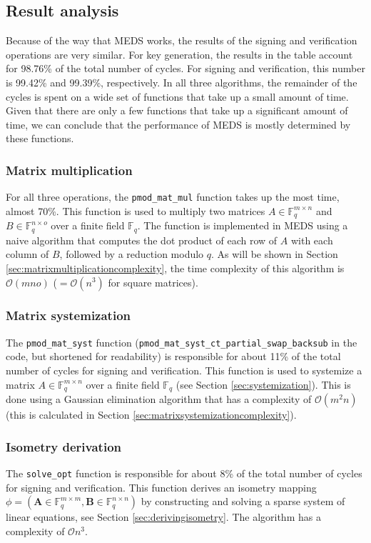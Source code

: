 \documentclass[11pt,a4paper]{report}
\theoremstyle{definition}
\begin{document}
\subsection{Result analysis}
Because of the way that MEDS works, the results of the signing and verification operations are very similar. For key generation, the results in the table account for 98.76\% of the total number of cycles. For signing and verification, this number is 99.42\% and 99.39\%, respectively. In all three algorithms, the remainder of the cycles is spent on a wide set of functions that take up a small amount of time. Given that there are only a few functions that take up a significant amount of time, we can conclude that the performance of MEDS is mostly determined by these functions.

\subsubsection{Matrix multiplication}
For all three operations, the \texttt{pmod\_mat\_mul} function takes up the most time, almost 70\%. This function is used to multiply two matrices $A \in \mathbb{F}_q^{m \times n}$ and $B \in \mathbb{F}_q^{n \times o}$ over a finite field $\mathbb{F}_q$. The function is implemented in MEDS using a naive algorithm that computes the dot product of each row of $A$ with each column of $B$, followed by a reduction modulo $q$. As will be shown in Section \ref{sec:matrixmultiplicationcomplexity}, the time complexity of this algorithm is $\mathcal{O}(mno)$ ($= \mathcal{O}(n^3)$ for square matrices).

\subsubsection{Matrix systemization}
The \texttt{pmod\_mat\_syst} function (\texttt{pmod\_mat\_syst\_ct\_partial\_swap\_backsub} in the code, but shortened for readability) is responsible for about 11\% of the total number of cycles for signing and verification. This function is used to systemize a matrix $A \in \mathbb{F}_q^{m \times n}$ over a finite field $\mathbb{F}_q$ (see Section \ref{sec:systemization}). This is done using a Gaussian elimination algorithm that has a complexity of $\mathcal{O}(m^2n)$ (this is calculated in Section \ref{sec:matrixsystemizationcomplexity}).

\subsubsection{Isometry derivation}
The \texttt{solve\_opt} function is responsible for about 8\% of the total number of cycles for signing and verification. This function derives an isometry mapping $\phi = (\textbf{A} \in \mathbb{F}_q^{m \times m}, \textbf{B} \in \mathbb{F}_q^{n \times n})$ by constructing and solving a sparse system of linear equations, see Section \ref{sec:derivingisometry}. The algorithm has a complexity of $\mathcal{O}{n^3}$.
\end{document}
